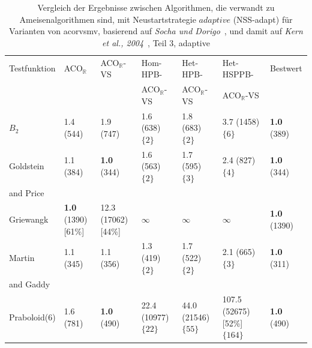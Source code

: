 \documentclass[fontsize=12, a4aper]{scrartcl}
\begin{document}
	\begin{table}[H]
		
		\caption{Vergleich der Ergebnisse zwischen Algorithmen, die verwandt zu Ameisenalgorithmen sind, mit Neustartstrategie \(adaptive\) (NSS-adapt) für Varianten von \acl{acorvsmv}, basierend auf \textit{Socha und Dorigo}~\cite{socha2008ant}, und damit auf \textit{Kern et al., 2004}~\cite{kern2004learning}, Teil 3, adaptive}
		
		\label{subsec:Vergleich_Von_ACO_R_Und_Iterationen_Von_ACO_R_Very_Simple:tab:Vergleich_Zu_Ameisen_Verwandte_Algorithmen_Teil_3}
		
		\scriptsize
		
		\begin{tabularx}{\linewidth}{l X X X X X X}
			
			\toprule
			
			Testfunktion & ACO\(_{\mathbb{R}}\) & ACO\(_{\mathbb{R}}\)-VS & Hom-HPB- & Het-HPB- & Het-HSPPB- & Bestwert\\
			&						&						  & ACO\(_\mathbb{R}\)-VS & ACO\(_\mathbb{R}\)-VS & ACO\(_\mathbb{R}\)-VS & \\
			
			
			\midrule
			
			\(B_2\) & 1.4 (544) & 1.9 (747) & 1.6 (638) \(\{2\}\) & 1.8 (683) \(\{2\}\) & 3.7 (1458) \(\{6\}\) & \textbf{1.0} (389)\\
			
			Goldstein & 1.1 (384) & \textbf{1.0} (344) & 1.6 (563) \(\{2\}\) & 1.7 (595) \(\{3\}\) & 2.4 (827) \(\{4\}\) & \textbf{1.0} (344)\\
			and Price & & & & & & \\
			
			Griewangk & \textbf{1.0} (1390) [61\%] & 12.3 (17062) [44\%] & \(\infty\) & \(\infty\) & \(\infty\) & \textbf{1.0} (1390)\\
			
			Martin & 1.1 (345) & 1.1 (356) & 1.3 (419) \(\{2\}\) & 1.7 (522) \(\{2\}\) & 2.1 (665) \(\{3\}\) & \textbf{1.0} (311)\\
			and Gaddy & & & & & & \\
			
			Praboloid(6) & 1.6 (781) & \textbf{1.0} (490) & 22.4 (10977) \(\{22\}\) & 44.0 (21546) \(\{55\}\) & 107.5 (52675) [52\%] \(\{164\}\) & \textbf{1.0} (490)\\
			

\end{tabularx}
\end{table}
\end{document}
